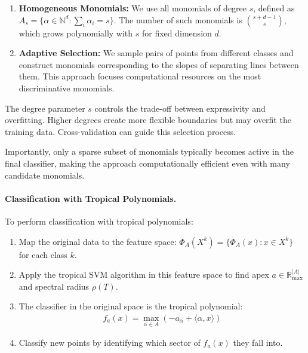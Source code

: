 \documentclass{article}
\newcommand{\Rmax}{\mathbb{R}_{\max}}
\begin{document}
\begin{enumerate}
    \item \textbf{Homogeneous Monomials:} We use all monomials of degree $s$, defined as 
    $A_s = \{\alpha \in \mathbb{N}^d : \sum_i \alpha_i = s\}$. The number of such monomials is $\binom{s+d-1}{s}$, which grows polynomially with $s$ for fixed dimension $d$.
    
    \item \textbf{Adaptive Selection:} We sample pairs of points from different classes and construct monomials corresponding to the slopes of separating lines between them. This approach focuses computational resources on the most discriminative monomials.
\end{enumerate}

The degree parameter $s$ controls the trade-off between expressivity and overfitting. Higher degrees create more flexible boundaries but may overfit the training data. Cross-validation can guide this selection process.

Importantly, only a sparse subset of monomials typically becomes active in the final classifier, making the approach computationally efficient even with many candidate monomials.

\paragraph{Classification with Tropical Polynomials.}\label{subsec:poly_classification}
To perform classification with tropical polynomials:

\begin{enumerate}
    \item Map the original data to the feature space: $\Phi_A(X^k) = \{\Phi_A(x) : x \in X^k\}$ for each class $k$.
    
    \item Apply the tropical SVM algorithm in this feature space to find apex $a \in \Rmax^{|A|}$ and spectral radius $\rho(T)$.
    
    \item The classifier in the original space is the tropical polynomial:
    \begin{align}
    f_a(x) = \max_{\alpha \in A} (-a_\alpha + \langle \alpha, x \rangle)
    \end{align}
    
    \item Classify new points by identifying which sector of $f_a(x)$ they fall into.
\end{enumerate}
\end{document}
